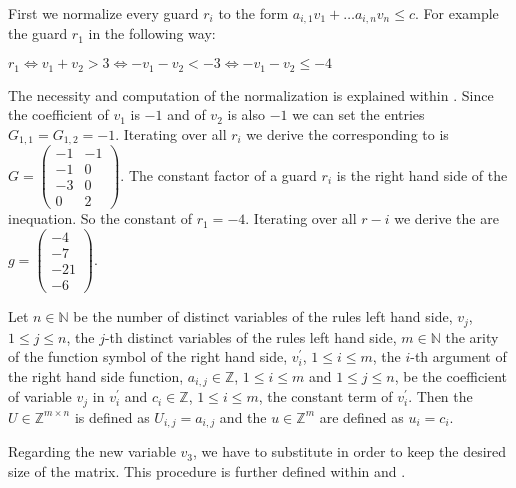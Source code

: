 \begin{example}
	\label{ex:guardmatrix-and-constants}
	First we normalize every guard $r_i$ to the form $a_{i,1}v_1+\dots a_{i,n}v_n \le c$. For example the guard $r_1$ in the following way:
	\begin{center}
		$r_1 \Leftrightarrow v_1+v_2 > 3  \Leftrightarrow -v_1-v_2 < -3 \Leftrightarrow -v_1-v_2 \le -4$
	\end{center}
	The necessity and computation of the normalization is explained within .\newline
	Since the coefficient of $v_1$ is $-1$ and of $v_2$ is also $-1$ we can set the entries $G_{1,1} = G_{1,2}=-1$.
	Iterating over all $r_i$ we derive the corresponding \guardmatrix to  is $G = \begin{pmatrix} -1 & -1 \\ -1 & 0 \\ -3 & 0 \\ 0 & 2 \end{pmatrix}$.
	The constant factor of a guard $r_i$ is the right hand side of the inequation. So the constant of $r_1=-4$. Iterating over all $r-i$ we derive the \guardconstants are $g= \begin{pmatrix} -4 \\ -7 \\ -21 \\ -6 \end{pmatrix}$.	
\end{example}

\begin{definition}
	\label{def:update}
	Let $n \in \mathbb{N}$ be the number of distinct variables of the \loopt rules left hand side, $v_j$, $1 \le j \le n$, the $j$-th distinct	variables of the \loopt rules left hand side, $m \in \mathbb{N}$ the arity of the function symbol of the right hand side, $v^\prime_i$, $1 \le i \le m$, the $i$-th argument of the right hand side function, $a_{i,j} \in \mathbb{Z}$, $1 \le i \le m$ and $1 \le j \le n$, be the coefficient of variable $v_j$ in $v^\prime_i$ and $c_i \in \mathbb{Z}$, $1 \le i \le m$, the constant term of $v^\prime_i$. \newline
	Then the \updatematrix $U \in \mathbb{Z}^{m \times n}$ is defined as $U_{i,j}=a_{i,j}$ and the \updateconstants $u \in \mathbb{Z}^m$ are defined as $u_i = c_i$.
\end{definition}
Regarding the new variable $v_3$, we have to substitute in order to keep the desired size of the matrix. This procedure is further defined within  and .

